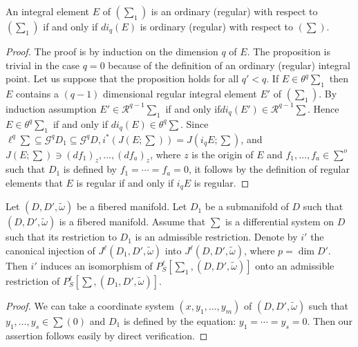 \begin{proposition}\label{chap3:sec3.4:prop8} %
  An integral element $E$ of $(\sum_1)$ is an ordinary (\resp \break  regular)
  with respect to $(\sum_1)$ if and only if $di_q(E)$ is ordinary
  (\resp  \break regular) with respect to $(\sum)$. 
\end{proposition}

\begin{proof}
  The proof is by induction on the dimension $q$ of $E$. The
  proposition is trivial in the case $q = 0$ because of the definition
  of an ordinary (\resp  regular) integral point. Let us suppose that
  the proposition holds for all $q' < q$. If $E \in \theta^q \sum_1$ then
  $E$ contains a $(q - 1)$ dimensional regular integral element $E'$
  of $(\sum_1)$. By induction assumption $E' \in \mathscr{R}^{q - 1}
  \sum_1$ if and only if\pageoriginale $di_q (E') \in \mathscr{R}^{q -1}
  \sum$. Hence $E \in \theta ^q \sum_1$ if and only if $di_q (E) \in
  \theta^q \sum$. Since $\ell^q \sum \subseteq \mathscr{G}^q D_1
  \subseteq \mathscr{G}^q D, i^* (J(E; \sum)) = J(i_q E; \sum)$, and
  $J(E; \sum) \ni (d f_1)_z, \ldots , (d f_a)_z$, where $z$ is the
  origin of $E$ and $f_1, \ldots , f_a \in \sum^o$ such that $D_1$ is
  defined by $f_1 = \cdots = f_a = 0$, it follows by the definition of
  regular elements that $E$ is regular if and only if $i_q E$ is
  regular. 
\end{proof}

\setcounter{propdash}{7}
\begin{propdash}\label{chap3:sec3.4:propdash8}%
  Let $(D, D', \tilde{\omega})$ be a fibered manifold. Let $D_1$ be a
  submanifold of $D$ such that $(D, D' , \tilde{\omega})$ is a fibered
  manifold. Assume that $\sum$ is a differential system on $D$ such
  that its restriction to $D_1$ is an admissible restriction. Denote
  by $i'$ the canonical injection of $J^\ell (D_1, D' , \tilde{\omega})$ into
  $J^\ell (D, D' , \tilde{\omega})$, where $p = \dim D'$. Then $i'$
  induces an isomorphism of $P^\ell_S [\sum_1, (D, D' ,
    \tilde{\omega})]$ onto an admissible restriction of $P^\ell_S
  [\sum , (D_1, D' , \tilde{\omega})]$. 
\end{propdash}

\begin{proof}
  We can take a coordinate system $(x, y_1, \ldots , y_m)$ of $(D, D'
  , \tilde{\omega})$ such that $y_1 , \ldots ,y_s \in \sum{(0)}$ and
  $D_1$ is defined by the equation: $y_1 = \cdots = y_s = 0$. Then our
  assertion follows easily by direct verification. 
\end{proof}

